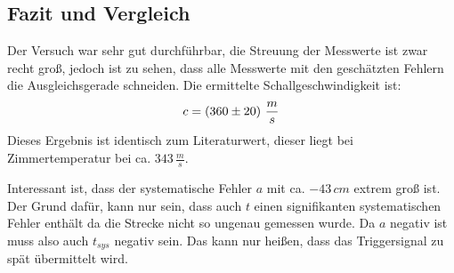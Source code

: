 \subsection{Fazit und Vergleich}
Der Versuch war sehr gut durchführbar, die Streuung der Messwerte ist zwar recht groß, jedoch ist zu sehen, dass alle Messwerte mit den geschätzten Fehlern die Ausgleichsgerade schneiden. Die ermittelte Schallgeschwindigkeit ist:
\begin{align}
c = \left( 360 \pm 20 \right)\, \frac{m}{s} \notag
\end{align}
Dieses Ergebnis ist identisch zum Literaturwert, dieser liegt bei Zimmertemperatur bei ca. \(343\, \frac{m}{s}\).

Interessant ist, dass der systematische Fehler \(a\) mit ca. \(-43\, cm\) extrem groß ist. Der Grund dafür, kann nur sein, dass auch \(t\) einen signifikanten systematischen Fehler enthält da die Strecke nicht so ungenau gemessen wurde. Da \(a\) negativ ist muss also auch \(t_{sys}\) negativ sein. Das kann nur heißen, dass das Triggersignal zu spät übermittelt wird.

